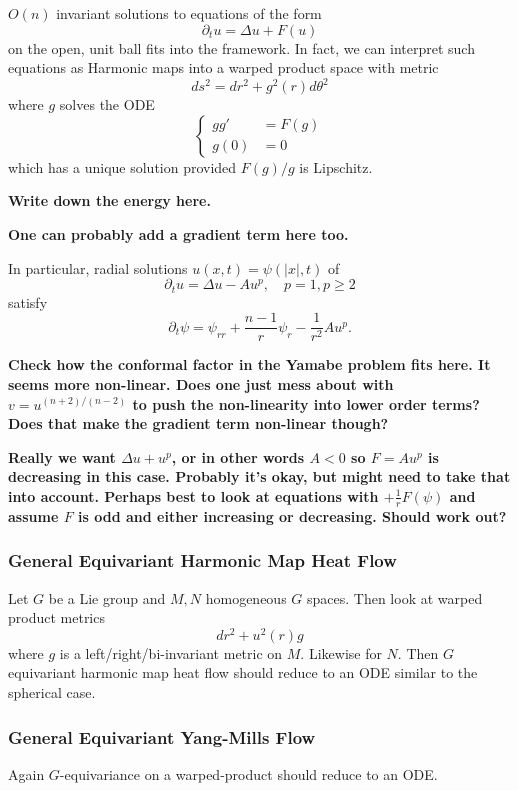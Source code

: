 \documentclass{amsart}
\begin{document}
\(O(n)\) invariant solutions to equations of the form
\[
\partial_t u = \Delta u + F(u)
\]
on the open, unit ball fits into the framework. In fact, we can interpret such equations as Harmonic maps into a warped product space with metric
\[
ds^2 = dr^2 + g^2(r) d\theta^2
\]
where \(g\) solves the ODE
\[
\begin{cases}
gg' &= F(g) \\
g(0) &= 0
\end{cases}
\]
which has a unique solution provided \(F(g)/g\) is Lipschitz.

\textbf{Write down the energy here.}

\textbf{One can probably add a gradient term here too.}

In particular, radial solutions \(u(x, t) = \psi(|x|, t)\) of
\[
\partial_t u = \Delta u - A u^p, \quad p = 1, p \geq 2
\]
satisfy
\[
\partial_t \psi = \psi_{rr} + \frac{n-1}{r} \psi_r - \frac{1}{r^2} A u^p.
\]

\textbf{Check how the conformal factor in the Yamabe problem fits here. It seems more non-linear. Does one just mess about with \(v = u^{(n+2)/(n-2)}\) to push the non-linearity into lower order terms? Does that make the gradient term non-linear though?}

\textbf{Really we want \(\Delta u + u^p\), or in other words \(A<0\) so \(F = A u^p\) is decreasing in this case. Probably it's okay, but might need to take that into account. Perhaps best to look at equations with \(+ \frac{1}{r} F(\psi)\) and assume \(F\) is odd and either increasing or decreasing. Should work out?}

\subsubsection*{General Equivariant Harmonic Map Heat Flow}

Let \(G\) be a Lie group and \(M, N\) homogeneous \(G\) spaces. Then look at warped product metrics
\[
dr^2 + u^2(r) g
\]
where \(g\) is a left/right/bi-invariant metric on \(M\). Likewise for \(N\). Then \(G\) equivariant harmonic map heat flow should reduce to an ODE similar to the spherical case.

\subsubsection*{General Equivariant Yang-Mills Flow}

Again \(G\)-equivariance on a warped-product should reduce to an ODE.
\end{document}
